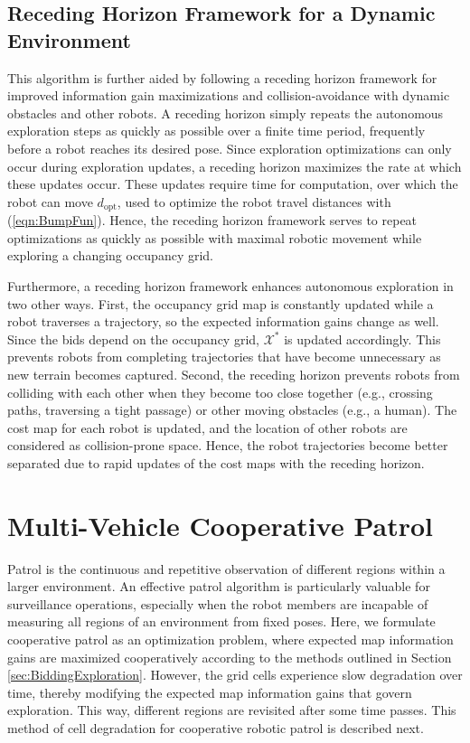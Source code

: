 \documentclass[smallextended]{svjour3}       %
\newcommand{\refeqn}[1]{(\ref{eqn:#1})}
\begin{document}
\subsection{Receding Horizon Framework for a Dynamic Environment}
This algorithm is further aided by following a receding horizon framework for improved information gain maximizations and collision-avoidance with dynamic obstacles and other robots. A receding horizon simply repeats the autonomous exploration steps as quickly as possible over a finite time period, frequently before a robot reaches its desired pose. Since exploration optimizations can only occur during exploration updates, a receding horizon maximizes the rate at which these updates occur. These updates require time for computation, over which the robot can move $d_\text{opt}$, used to optimize the robot travel distances with \refeqn{BumpFun}. Hence, the receding horizon framework serves to repeat optimizations as quickly as possible with maximal robotic movement while exploring a changing occupancy grid.

Furthermore, a receding horizon framework enhances autonomous exploration in two other ways. First, the occupancy grid map is constantly updated while a robot traverses a trajectory, so the expected information gains change as well. Since the bids depend on the occupancy grid, $\mathcal X^*$ is updated accordingly. This prevents robots from completing trajectories that have become unnecessary as new terrain becomes captured. Second, the receding horizon prevents robots from colliding with each other when they become too close together (e.g., crossing paths, traversing a tight passage) or other moving obstacles (e.g., a human). The cost map for each robot is updated, and the location of other robots are considered as collision-prone space. Hence, the robot trajectories become better separated due to rapid updates of the cost maps with the receding horizon. 

\section{Multi-Vehicle Cooperative Patrol}
\label{sec:MultiVehicleCooperativePatrol}

Patrol is the continuous and repetitive observation of different regions within a larger environment. An effective patrol algorithm is particularly valuable for surveillance operations, especially when the robot members are incapable of measuring all regions of an environment from fixed poses. Here, we formulate cooperative patrol as an optimization problem, where expected map information gains are maximized cooperatively according to the methods outlined in Section \ref{sec:BiddingExploration}. However, the grid cells experience slow degradation over time, thereby modifying the expected map information gains that govern exploration. This way, different regions are revisited after some time passes. This method of cell degradation for cooperative robotic patrol is described next.
\end{document}
